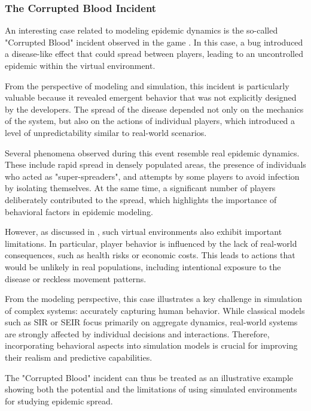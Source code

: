 \documentclass[english]{projectreport}
\begin{document}
\subsubsection{The Corrupted Blood Incident}
\label{sec:corrupted-blood}

An interesting case related to modeling epidemic dynamics is the so-called "Corrupted Blood" incident observed in the game \cite{lofgren2007virtual}. In this case, a bug introduced a disease-like effect that could spread between players, leading to an uncontrolled epidemic within the virtual environment.

From the perspective of modeling and simulation, this incident is particularly valuable because it revealed emergent behavior that was not explicitly designed by the developers. The spread of the disease depended not only on the mechanics of the system, but also on the actions of individual players, which introduced a level of unpredictability similar to real-world scenarios.

Several phenomena observed during this event resemble real epidemic dynamics. These include rapid spread in densely populated areas, the presence of individuals who acted as "super-spreaders", and attempts by some players to avoid infection by isolating themselves. At the same time, a significant number of players deliberately contributed to the spread, which highlights the importance of behavioral factors in epidemic modeling.

However, as discussed in \cite{lofgren2007virtual}, such virtual environments also exhibit important limitations. In particular, player behavior is influenced by the lack of real-world consequences, such as health risks or economic costs. This leads to actions that would be unlikely in real populations, including intentional exposure to the disease or reckless movement patterns.

From the modeling perspective, this case illustrates a key challenge in simulation of complex systems: accurately capturing human behavior. While classical models such as SIR or SEIR focus primarily on aggregate dynamics, real-world systems are strongly affected by individual decisions and interactions. Therefore, incorporating behavioral aspects into simulation models is crucial for improving their realism and predictive capabilities.

The "Corrupted Blood" incident can thus be treated as an illustrative example showing both the potential and the limitations of using simulated environments for studying epidemic spread.
\end{document}
